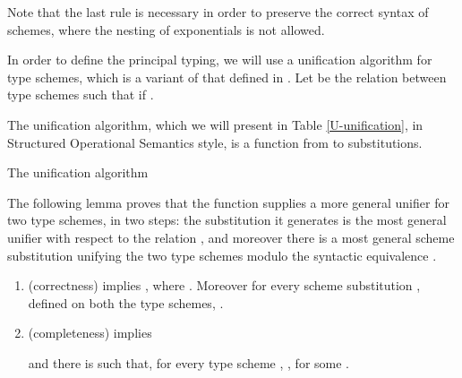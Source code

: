   Note that the last rule is necessary in order to preserve the 
  correct syntax of schemes, where the nesting of exponentials is not allowed. 

  In order to define the principal typing, we will use a unification
algorithm for type schemes, which is a variant of that defined in
\cite{Coppola03tlca}.  Let  be the relation between type schemes
such that  if .

The unification algorithm, which we will present in Table
\ref{U-unification}, in Structured Operational Semantics style, is a function  from 
to substitutions.





\begin{table*}
\begin{center}
\end{center}
\caption{The unification algorithm }\label{U-unification}
\end{table*}

The following lemma  proves that the function  supplies a more general unifier for two type schemes,
in two steps: the substitution it generates is the most general unifier with respect to
the relation , and moreover there is a most general scheme substitution
unifying the two type schemes modulo the syntactic equivalence .

\begin{lem}\label{e-unif}\hfill
\begin{enumerate}[\em i)]
\item (correctness)  implies
  ,   
   where .
  Moreover for every scheme substitution , defined on both the type schemes,
  .
\item (completeness)  implies
   
and  there is  such that, for every type scheme , 
  , for some .
\end{enumerate}
\end{lem}

